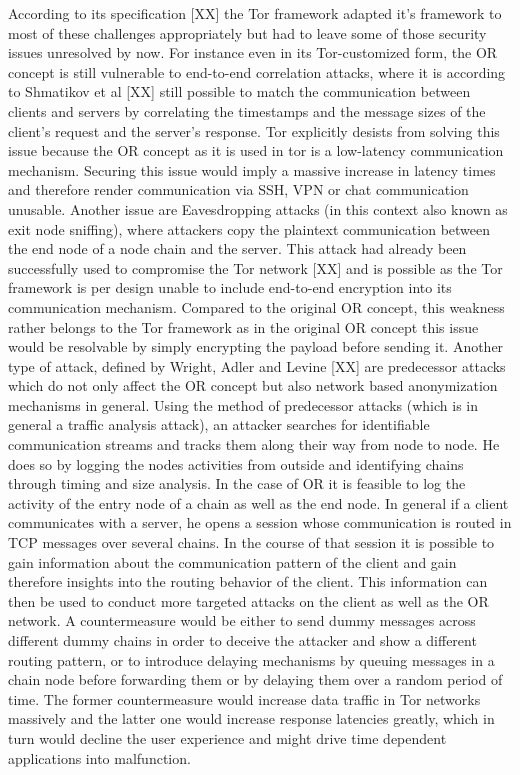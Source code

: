 \documentclass{sig-alternate}
\begin{document}
According to its specification [XX] the Tor framework adapted it’s framework to most of these challenges appropriately but had to leave some of those security issues unresolved by now. For instance even in its Tor-customized form, the OR concept is still vulnerable to end-to-end correlation attacks, where it is according to Shmatikov et al [XX] still possible to match the communication between clients and servers by correlating the timestamps and the message sizes of the client’s request and the server’s response. Tor explicitly desists from solving this issue because the OR concept as it is used in tor is a low-latency communication mechanism. Securing this issue would imply a massive increase in latency times and therefore render communication via SSH, VPN or chat communication unusable. Another issue are Eavesdropping attacks (in this context also known as exit node sniffing), where attackers copy the plaintext communication between the end node of a node chain and the server. This attack had already been successfully used to compromise the Tor network [XX] and is possible as the Tor framework is per design unable to include end-to-end encryption into its communication mechanism. Compared to the original OR concept, this weakness rather belongs to the Tor framework as in the original OR concept this issue would be resolvable by simply encrypting the payload before sending it. Another type of attack, defined by Wright, Adler and Levine [XX] are predecessor attacks which do not only affect the OR concept but also network based anonymization mechanisms in general. Using the method of predecessor attacks (which is in general a traffic analysis attack), an attacker searches for identifiable communication streams and tracks them along their way from node to node. He does so by logging the nodes activities from outside and identifying chains through timing and size analysis. In the case of OR it is feasible to log the activity of the entry node of a chain as well as the end node. In general if a client communicates with a server, he opens a session whose communication is routed in TCP messages over several chains. In the course of that session it is possible to gain information about the communication pattern of the client and gain therefore insights into the routing behavior of the client. This information can then be used to conduct more targeted attacks on the client as well as the OR network. A countermeasure would be either to send dummy messages across different dummy chains in order to deceive the attacker and show a different routing pattern, or to introduce delaying mechanisms by queuing messages in a chain node before forwarding them or by delaying them over a random period of time. The former countermeasure would increase data traffic in Tor networks massively and the latter one would increase response latencies greatly, which in turn would decline the user experience and might drive time dependent applications into malfunction. 
\end{document}
